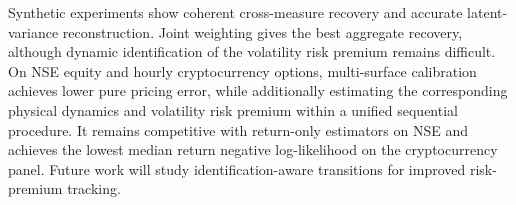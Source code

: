 \documentclass[sigconf,anonymous,review]{acmart}
\begin{document}
Synthetic experiments show coherent cross-measure recovery and accurate
latent-variance reconstruction. Joint weighting gives the best aggregate
recovery, although dynamic identification of the volatility risk premium remains difficult. On NSE equity and hourly cryptocurrency options,
multi-surface calibration achieves lower pure pricing error, while additionally estimating the corresponding physical dynamics and volatility
risk premium within a unified sequential procedure. It
remains competitive with return-only estimators on NSE and achieves the lowest median return negative log-likelihood on the cryptocurrency
panel. Future work will
study identification-aware transitions for improved risk-premium tracking.





\end{document}
